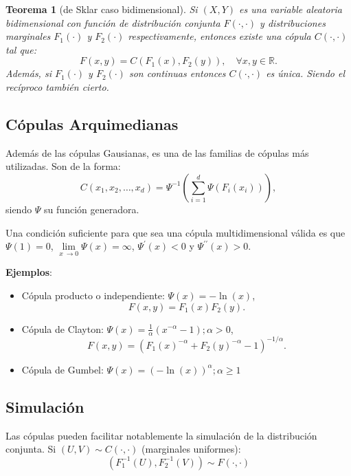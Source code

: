 \documentclass[
]{book}
\theoremstyle{break}
\newtheorem{theorem}{Teorema}[chapter]
\theoremstyle{nonumberplain}
\begin{document}
\begin{theorem}[de Sklar caso bidimensional]
\protect\hypertarget{thm:sklar}{}\label{thm:sklar}
Si \((X,Y)\) es una variable aleatoria bidimensional con función de distribución conjunta \(F(\cdot,\cdot)\) y distribuciones marginales \(F_1(\cdot)\) y \(F_2(\cdot)\) respectivamente, entonces existe una cópula \(C(\cdot,\cdot)\) tal que:
\[F(x,y)=C\left( F_1(x),F_2(y)\right) ,\quad \forall x,y\in\mathbb{R}.\]
Además, si \(F_1(\cdot)\) y \(F_2(\cdot)\) son continuas entonces \(C(\cdot,\cdot)\) es única.
Siendo el recíproco también cierto.
\end{theorem}

\hypertarget{cuxf3pulas-arquimedianas}{%
\subsection{Cópulas Arquimedianas}\label{cuxf3pulas-arquimedianas}}

Además de las cópulas Gausianas, es una de las familias de cópulas más utilizadas.
Son de la forma:
\[C(x_1,x_2,\dots,x_d)
=\Psi^{-1}\left( \sum_{i=1}^d\Psi\left( F_i(x_i)\right)\right),\]
siendo \(\Psi\) su función generadora.

Una condición suficiente para que sea una cópula multidimensional válida es que \(\Psi(1)=0\), \(\lim \limits_{x\ \rightarrow0}\Psi(x)=\infty\), \(\Psi^{\prime}(x)<0\) y \(\Psi^{\prime \prime}(x)>0\).

\textbf{Ejemplos}:

\begin{itemize}
\item
  Cópula producto o independiente:
  \(\Psi(x)=-\ln(x)\),
  \[F(x,y)=F_1(x)F_2(y).\]
\item
  Cópula de Clayton: \(\Psi(x)=\frac{1}{\alpha}\left( x^{-\alpha }-1\right) ;\alpha>0\),
  \[F(x,y)=(F_1(x)^{-\alpha}+F_2(y)^{-\alpha}-1)^{-1/\alpha}.\]
\item
  Cópula de Gumbel:
  \(\Psi(x)=\left( -\ln(x)\right)^{\alpha};\alpha \geq1\)
\end{itemize}

\hypertarget{simulaciuxf3n}{%
\subsection{Simulación}\label{simulaciuxf3n}}

Las cópulas pueden facilitar notablemente la simulación de la distribución conjunta.
Si \((U,V)\sim C(\cdot,\cdot)\) (marginales uniformes):
\[\left( F_1^{-1}(U),F_2^{-1}(V)\right)  \sim F(\cdot,\cdot)\]
\end{document}
